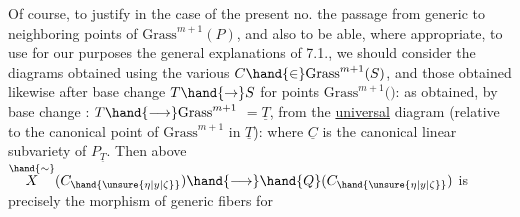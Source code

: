 
Of course, to justify in the  case of the present no. the passage
from generic \hand{$\eta$} to neighboring points of $\mathrm{Grass}^{m+1}(P)$, and also to be able,
where appropriate, to use for our purposes the general explanations of
7.1., we should consider the diagrams
obtained using the various $C \hand{\in} \mathrm{Grass}^{m+1}(S)$, and  those obtained likewise
after base change $T \hand{\to} S$ for points \hand{$\unsure{\xi|\zeta}$} \hand{$\in$} $\mathrm{Grass}^{m+1}($$)$:
\diagram{\[\begin{array}{ccc}
X_T & \hand{\longleftarrow} & \overset{\hand{\sim}}{X}(C_{\hand{\unsure{\xi|\zeta}}}) = \overset{\hand{\sim}}{X}_T(C_{\hand{\unsure{\xi|\zeta}}}) \\
\hand{\downarrow} & & \hand{\downarrow} \\
T & \hand{\longleftarrow} & \hand{Q}(C_{\hand{\unsure{\xi|\zeta}}})
\end{array}\]}
as obtained, by base change \hand{$\unsure{\xi|\zeta}$}: $T \hand{\longrightarrow} \mathrm{Grass}^{m+1}$ $= \underline{T}$,
from the \uline{universal} diagram (relative to the canonical point of $\mathrm{Grass}^{m+1}$ in $\underline{T}$):
where $\underline{C}$ is the canonical linear subvariety of $P_{\underline{T}}$. Then above
$\overset{\hand{\sim}}{X}(C_{\hand{\unsure{\eta|y|\zeta}}}) \hand{\longrightarrow} \hand{Q}(C_{\hand{\unsure{\eta|y|\zeta}}})$ is precisely the morphism of generic fibers for
